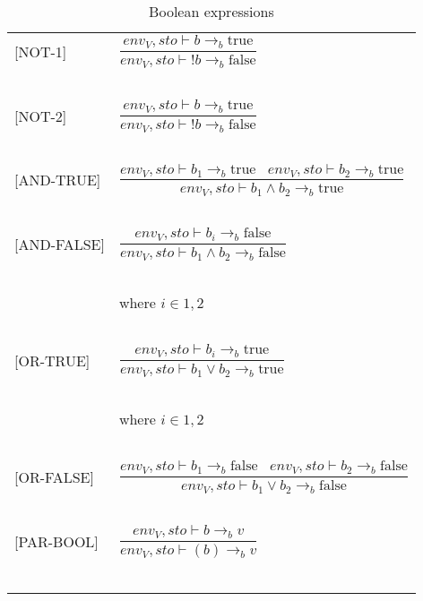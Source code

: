 \begin{longtable}{l l}
[NOT-1] & $\dfrac{env_V, sto \vdash b \rightarrow_b \text{true}}{env_V, sto \vdash !b \rightarrow_b \text{false}}$ \\
~ & ~ \\

[NOT-2] & $\dfrac{env_V, sto \vdash b \rightarrow_b \text{true}}{env_V, sto \vdash !b \rightarrow_b \text{false}}$ \\
~ & ~ \\

[AND-TRUE] & $\dfrac{env_V, sto \vdash b_1 \rightarrow_b \text{true} \; \; \; env_V, sto \vdash b_2 \rightarrow_b \text{true}}{env_V, sto \vdash b_1 \wedge b_2 \rightarrow_b \text{true}}$ \\
~ & ~ \\

[AND-FALSE] & $\dfrac{env_V, sto \vdash b_i \rightarrow_b \text{false}}{env_V, sto \vdash b_1 \wedge b_2 \rightarrow_b \text{false}}$ \\
~ & ~ \\
~ & \indent\indent where $i \in {1,2}$ \\
~ & ~ \\

[OR-TRUE] & $\dfrac{env_V, sto \vdash b_i \rightarrow_b \text{true}}{env_V, sto \vdash b_1 \vee b_2 \rightarrow_b \text{true}}$ \\
~ & ~ \\
~ & \indent\indent where $i \in {1,2}$ \\
~ & ~ \\

[OR-FALSE] & $\dfrac{env_V, sto \vdash b_1 \rightarrow_b \text{false} \; \; \; env_V, sto \vdash b_2 \rightarrow_b \text{false}}{env_V, sto \vdash b_1 \vee b_2 \rightarrow_b \text{false}}$ \\
~ & ~ \\

[PAR-BOOL] & $\dfrac{env_V, sto \vdash b \rightarrow_b v}{env_V, sto \vdash (b) \rightarrow_b v}$ \\
~ & ~ \\
\caption{Boolean expressions}
\end{longtable}

